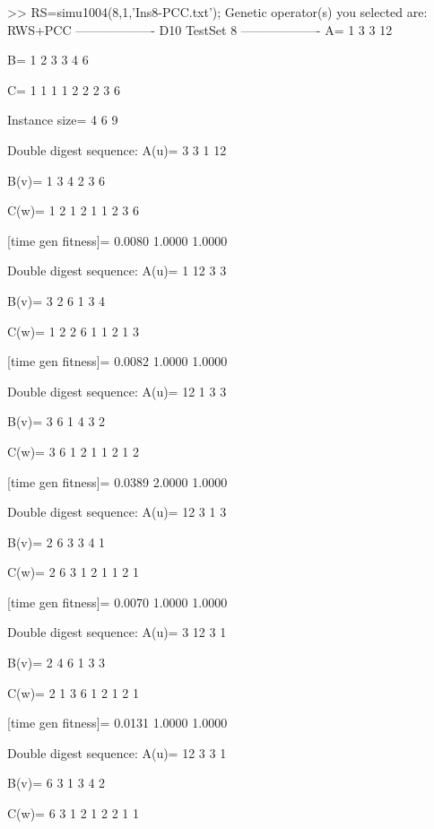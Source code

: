 >> RS=simu1004(8,1,'Ins8-PCC.txt');
Genetic operator(s) you selected are:
RWS+PCC
------------------- D10 TestSet 8 -------------------
A=
     1     3     3    12

B=
     1     2     3     3     4     6

C=
     1     1     1     1     2     2     2     3     6

Instance size=
     4     6     9

Double digest sequence:
A(u)=
     3     3     1    12

B(v)=
     1     3     4     2     3     6

C(w)=
     1     2     1     2     1     1     2     3     6

[time gen fitness]=
    0.0080    1.0000    1.0000

Double digest sequence:
A(u)=
     1    12     3     3

B(v)=
     3     2     6     1     3     4

C(w)=
     1     2     2     6     1     1     2     1     3

[time gen fitness]=
    0.0082    1.0000    1.0000

Double digest sequence:
A(u)=
    12     1     3     3

B(v)=
     3     6     1     4     3     2

C(w)=
     3     6     1     2     1     1     2     1     2

[time gen fitness]=
    0.0389    2.0000    1.0000

Double digest sequence:
A(u)=
    12     3     1     3

B(v)=
     2     6     3     3     4     1

C(w)=
     2     6     3     1     2     1     1     2     1

[time gen fitness]=
    0.0070    1.0000    1.0000

Double digest sequence:
A(u)=
     3    12     3     1

B(v)=
     2     4     6     1     3     3

C(w)=
     2     1     3     6     1     2     1     2     1

[time gen fitness]=
    0.0131    1.0000    1.0000

Double digest sequence:
A(u)=
    12     3     3     1

B(v)=
     6     3     1     3     4     2

C(w)=
     6     3     1     2     1     2     2     1     1

